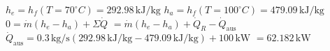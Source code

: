 \( h_e = h_f (T = 70^\circ C) = 292.98 \, \text{kJ/kg} \)  
\( h_a = h_f (T = 100^\circ C) = 479.09 \, \text{kJ/kg} \)  
\( 0 = \dot{m} (h_e - h_a) + \Sigma \dot{Q} \)  
\( = \dot{m} (h_e - h_a) + \dot{Q}_R - \dot{Q}_{\text{aus}} \)  
\( \dot{Q}_{\text{aus}} = 0.3 \, \text{kg/s} (292.98 \, \text{kJ/kg} - 479.09 \, \text{kJ/kg}) + 100 \, \text{kW} \)  
\( = 62.182 \, \text{kW} \)